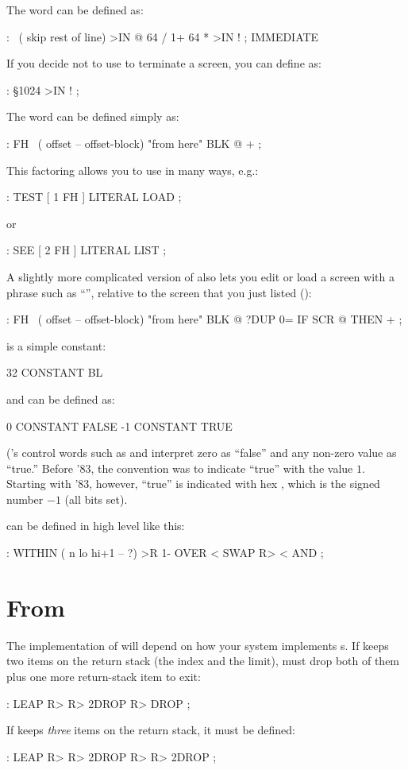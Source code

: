 The word \forthb{\bs} can be defined as:
\begin{Code}
: \  ( skip rest of line)
     >IN @  64 / 1+  64 *  >IN ! ; IMMEDIATE
\end{Code}
If you decide not to use  to terminate a screen, you can
define  as:
\begin{Code}
: \S   1024 >IN ! ;
\end{Code}
%
The word  can be defined simply as:
\begin{Code}
: FH   \   ( offset -- offset-block)   "from here"
    BLK @ + ;
\end{Code}
This factoring allows you to use  in many ways, e.g.:
\begin{Code}
: TEST   [ 1 FH ] LITERAL LOAD ;
\end{Code}
or
\begin{Code}
: SEE   [ 2 FH ] LITERAL LIST ;
\end{Code}
A slightly more complicated version of  also lets you edit or
load a screen with a phrase such as ``'', relative to
the screen that you just listed ():
\begin{Code}
: FH   \   ( offset -- offset-block)   "from here"
     BLK @  ?DUP 0= IF  SCR @  THEN  + ;
\end{Code}
 is a simple constant:
\begin{Code}
32 CONSTANT BL
\end{Code}
 and 
can be defined as:
\begin{Code}
0 CONSTANT FALSE
-1 CONSTANT TRUE
\end{Code}
(\Forth{}'s control words such as  and  interpret
zero as ``false'' and any non-zero value as ``true.''  Before \Forth{}
'83, the convention was to indicate ``true'' with the value $1$.  Starting
with \Forth{} '83, however, ``true'' is indicated with hex ,
which is the signed number $-1$ (all bits set).

 can be defined in high level like this:
\begin{Code}
: WITHIN  ( n lo hi+1 -- ?)
     >R  1- OVER <  SWAP R>  < AND ;
\end{Code}

\section{From }

The implementation of  will depend on how your
system implements  s.  If  keeps two
items on the return stack (the index and the limit),  must
drop both of them plus one more return-stack item to exit:
\begin{Code}
: LEAP   R> R> 2DROP  R> DROP ;
\end{Code}
If  keeps \emph{three} items on the return stack, it must be
defined:
\begin{Code}
: LEAP   R> R> 2DROP  R> R> 2DROP ;
\end{Code}

